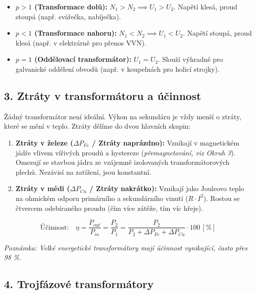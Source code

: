\documentclass[a4paper,10pt]{article}
\newcommand{\jednotka}[1]{\,[\mathrm{#1}]}
\begin{document}
\begin{vysvetlenibox}
\begin{itemize}
  \item \textbf{$p > 1$ (Transformace dolů):} $N_1 > N_2 \implies U_1 > U_2$. Napětí klesá, proud stoupá (např. svářečka, nabíječka).
  \item \textbf{$p < 1$ (Transformace nahoru):} $N_1 < N_2 \implies U_1 < U_2$. Napětí stoupá, proud klesá (např. v elektrárně pro přenos VVN).
  \item \textbf{$p = 1$ (Oddělovací transformátor):} $U_1 = U_2$. Slouží výhradně pro galvanické oddělení obvodů (např. v koupelnách pro holicí strojky).
\end{itemize}

\subsection*{3. Ztráty v transformátoru a účinnost}

Žádný transformátor není ideální. Výkon na sekundáru je vždy menší o ztráty, které se mění v teplo. Ztráty dělíme do dvou hlavních skupin:

\begin{enumerate}
  \item \textbf{Ztráty v železe ($\Delta P_{Fe}$ / Ztráty naprázdno):} Vznikají v magnetickém jádře vlivem vířivých proudů a hystereze (\textit{přemagnetování, viz Okruh 3}). Omezují se stavbou jádra ze vzájemně izolovaných transformátorových plechů. Nezávisí na zatížení, jsou konstantní.
  \item \textbf{Ztráty v mědi ($\Delta P_{Cu}$ / Ztráty nakrátko):} Vznikají jako Jouleovo teplo na ohmickém odporu primárního a sekundárního vinutí ($R \cdot I^2$). Rostou se čtvercem odebíraného proudu (čím více zátěže, tím víc hřeje).
\end{enumerate}

\begin{vzorcebox}
\[
\text{Účinnost:} \quad \eta = \frac{P_{out}}{P_{in}} = \frac{P_2}{P_1} = \frac{P_2}{P_2 + \Delta P_{Fe} + \Delta P_{Cu}} \cdot 100 \jednotka{\%}
\]
\end{vzorcebox}
\textit{Poznámka: Velké energetické transformátory mají účinnost vynikající, často přes 98 \%.}

\subsection*{4. Trojfázové transformátory}


\end{vysvetlenibox}
\end{document}
